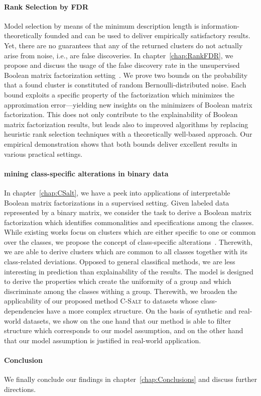 \paragraph{Rank Selection by FDR}
Model selection by means of the minimum description length is information-theoretically founded and can be used to deliver empirically satisfactory results.
Yet, there are no guarantees that any of the returned clusters do not actually arise from noise, i.e., are false discoveries. In chapter~\ref{chap:RankFDR}, we propose and discuss the usage of the false discovery rate in the unsupervised Boolean matrix factorization setting~\citep{hess2018trustworthy}. We prove two bounds on the probability that a found cluster is constituted of random Bernoulli-distributed noise. Each bound exploits a specific property of the factorization which minimizes the approximation error---yielding new insights on the minimizers of Boolean matrix factorization. This does not only contribute to the explainability of Boolean matrix factorization results, but leads also to improved algorithms by replacing heuristic rank selection techniques with a theoretically well-based approach. Our empirical demonstration shows that both bounds deliver excellent results in various practical settings.
\paragraph{mining class-specific alterations in binary data} In chapter~\ref{chap:CSalt}, we have a peek into applications of interpretable Boolean matrix factorizations in a supervised setting.
Given labeled data represented by a binary matrix, we consider the task to derive a Boolean matrix factorization which identifies commonalities and specifications among the classes. While existing works focus on clusters which are either specific to one or common over the classes, we propose the concept of class-specific alterations~\citep{hess2017csalt}. Therewith, we are able to derive clusters which are common to all classes together with its class-related deviations. Opposed to general classifical methods, we are less interesting in prediction than explainability of the results. The model is designed to derive the properties which create the uniformity of a group and which discriminate among the classes withing a group. Therewith, we broaden the applicability of our proposed method \textsc{C-Salt} to datasets whose class-dependencies have a more complex structure. On the basis of synthetic and real-world datasets, we show on the one hand that our method is  able to filter structure which corresponds to our model assumption, and on the other hand that our model assumption is justified in real-world application.

\paragraph{Conclusion} We finally conclude our findings in chapter~\ref{chap:Conclusions} and discuss further directions.
